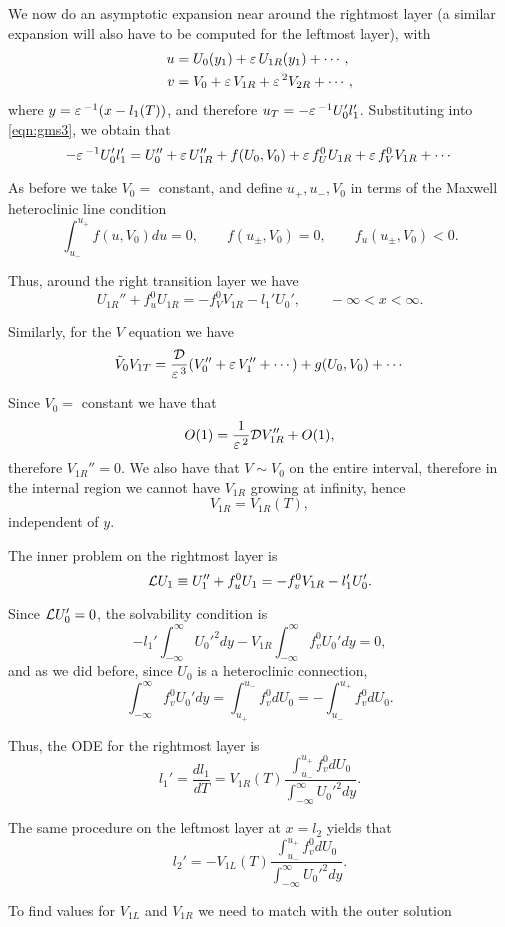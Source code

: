 We now do an asymptotic expansion near around the rightmost layer (a similar expansion will also have to be computed for the leftmost layer), with 
% 
\[
\begin{split}
  u &= U_0(y_1)+\varepsilon\, U_{1R}(y_1)+\cdots,\\
  v &= V_0 + \varepsilon\, V_{1R} + \varepsilon\,^2V_{2R} + \cdots,
\end{split}
\]
% 
where $y = \varepsilon\,^{-1}(x-l_1(T))$, and therefore $u_T = -\varepsilon\,^{-1}U_0'l_1'$. Substituting into \eqref{eqn:gms3}, we obtain that
% 
\[
  -\varepsilon\,^{-1}U_0'l_1' = U_0''+\varepsilon\, U_{1R}''+f(U_0,V_0) + \varepsilon\, f_U^0U_{1R} + \varepsilon\, f_V^0V_{1R}+\cdots
\]
% 

As before we take $V_0=$ constant, and define $u_+,u_-,V_0$ in terms of the Maxwell heteroclinic line condition
% 
\[
  \int_{u_-}^{u_+}f(u,V_0)du=0,\qquad f(u_{\pm},V_0)=0,\qquad f_u(u_{\pm},V_0)<0.
\]
% 

Thus, around the right transition layer we have
% 
\[
  U_{1R}''+f_u^0U_{1R} = -f_V^0V_{1R} - l_1'U_0',\qquad -\infty<x<\infty.
\]
% 

Similarly, for the $V$ equation we have
% 
\[
  \tilde{V}_0V_{1T} = \frac{\mathcal{D}}{\varepsilon\,^3}(V_0'' + \varepsilon\, V_1''+\cdots) + g(U_0,V_0)+\cdots
\]
% 

Since $V_0=$ constant we have that 
% 
\[
  O(1) = \frac{1}{\varepsilon\,^2}\mathcal{D} V_{1R}'' + O(1),
\]
% 
therefore $V_{1R}'' = 0$. We also have that $V\sim V_0$ on the entire interval, therefore in the internal region we cannot have $V_{1R}$ growing at infinity, hence
% 
\[
  V_{1R} = V_{1R}(T),
\]
% 
independent of $y$.

The inner problem on the rightmost layer is 
% 
\[
  \mathcal{L} U_1 \equiv U_1'' + f_u^0 U_1 = -f_v^0 V_{1R} - l_1'U_0'.
\]
% 

Since $\mathcal{L} U_0' = 0$, the solvability condition is
% 
\[
  -l_1'\int_{-\infty}^{\infty}U_0'^2dy - V_{1R}\int_{-\infty}^{\infty}f_v^0U_0'dy = 0,
\]
% 
and as we did before, since $U_0$ is a heteroclinic connection, 
% 
\[
  \int_{-\infty}^{\infty}f_v^0U_0'dy = \int_{u_+}^{u_-}f_v^0dU_0 = -\int_{u_-}^{u_+}f_v^0dU_0.
\]
% 

Thus, the ODE for the rightmost layer is
% 
\[
  l_1' = \frac{dl_1}{dT} = V_{1R}(T)\frac{\int_{u_-}^{u_+}f_v^0dU_0}{\int_{-\infty}^{\infty}U_0'^2dy}.
\]
% 

The same procedure on the leftmost layer at $x = l_2$ yields that
% 
\[
  l_2' = -V_{1L}(T)\frac{\int_{u_-}^{u_+}f_v^0dU_0}{\int_{-\infty}^{\infty}U_0'^2dy}.
\]
% 

To find values for $V_{1L}$ and $V_{1R}$ we need to match with the outer solution

